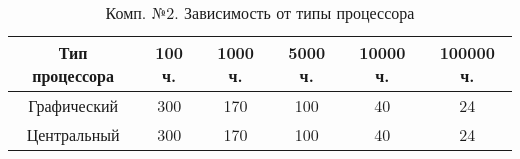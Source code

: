 \begin{table}[H]
  \caption{\label{tab:snd:cpu}Комп. №2. Зависимость от типы процессора}
  \begin{center}
    \begin{tabular}{|c|c|c|c|c|c|}
      \hline
      Тип процессора & 100 ч. & 1000 ч. & 5000 ч. & 10000 ч. & 100000 ч. \\
      \hline
      Графический & 300 & 170 & 100 & 40 & 24 \\
      Центральный & 300 & 170 & 100 & 40 & 24 \\
      \hline
    \end{tabular}
  \end{center}
\end{table}


